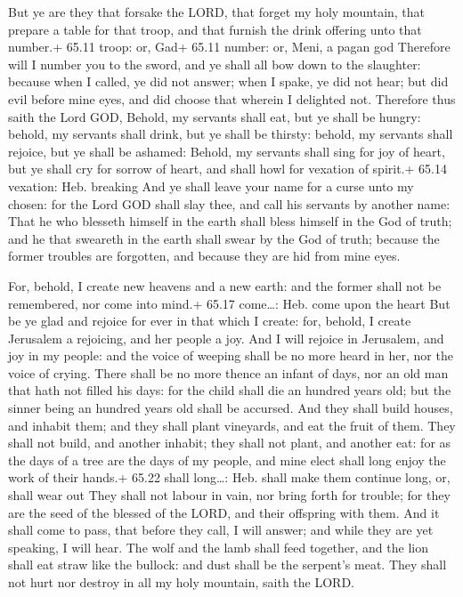  But ye are they that forsake the LORD, that forget my
holy mountain, that prepare a table for that troop, and that furnish the
drink offering unto that number.+ 65.11 troop: or, Gad+ 65.11 number:
or, Meni, a pagan god  Therefore will I number you to the
sword, and ye shall all bow down to the slaughter: because when I
called, ye did not answer; when I spake, ye did not hear; but did evil
before mine eyes, and did choose that wherein I delighted not.
 Therefore thus saith the Lord GOD, Behold, my servants
shall eat, but ye shall be hungry: behold, my servants shall drink, but
ye shall be thirsty: behold, my servants shall rejoice, but ye shall be
ashamed:  Behold, my servants shall sing for joy of heart,
but ye shall cry for sorrow of heart, and shall howl for vexation of
spirit.+ 65.14 vexation: Heb. breaking  And ye shall leave
your name for a curse unto my chosen: for the Lord GOD shall slay thee,
and call his servants by another name:  That he who
blesseth himself in the earth shall bless himself in the God of truth;
and he that sweareth in the earth shall swear by the God of truth;
because the former troubles are forgotten, and because they are hid from
mine eyes.

 For, behold, I create new heavens and a new earth: and
the former shall not be remembered, nor come into mind.+ 65.17
come\ldots: Heb. come upon the heart  But be ye glad and
rejoice for ever in that which I create: for, behold, I create Jerusalem
a rejoicing, and her people a joy.  And I will rejoice in
Jerusalem, and joy in my people: and the voice of weeping shall be no
more heard in her, nor the voice of crying.  There shall be
no more thence an infant of days, nor an old man that hath not filled
his days: for the child shall die an hundred years old; but the sinner
being an hundred years old shall be accursed.  And they
shall build houses, and inhabit them; and they shall plant vineyards,
and eat the fruit of them.  They shall not build, and
another inhabit; they shall not plant, and another eat: for as the days
of a tree are the days of my people, and mine elect shall long enjoy the
work of their hands.+ 65.22 shall long\ldots: Heb. shall make them
continue long, or, shall wear out  They shall not labour in
vain, nor bring forth for trouble; for they are the seed of the blessed
of the LORD, and their offspring with them.  And it shall
come to pass, that before they call, I will answer; and while they are
yet speaking, I will hear.  The wolf and the lamb shall
feed together, and the lion shall eat straw like the bullock: and dust
shall be the serpent's meat. They shall not hurt nor destroy in all my
holy mountain, saith the LORD.

